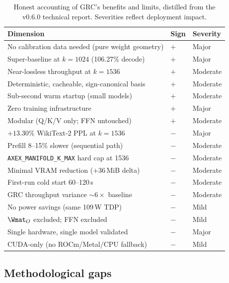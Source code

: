 \documentclass[11pt]{article}
\begin{document}
\begin{table}[h]\centering\footnotesize
\caption{Honest accounting of GRC's benefits and limits, distilled from the
v0.6.0 technical report. Severities reflect deployment impact.}
\begin{tabular}{@{}lll@{}}
\toprule
\textbf{Dimension} & \textbf{Sign} & \textbf{Severity}\\
\midrule
No calibration data needed (pure weight geometry)  & $+$ & Major\\
Super-baseline at $k{=}1024$ (106.27\% decode)     & $+$ & Major\\
Near-lossless throughput at $k{=}1536$             & $+$ & Moderate\\
Deterministic, cacheable, sign-canonical basis     & $+$ & Moderate\\
Sub-second warm startup (small models)             & $+$ & Moderate\\
Zero training infrastructure                       & $+$ & Major\\
Modular (Q/K/V only; FFN untouched)                & $+$ & Moderate\\
\midrule
$+13.30\%$ WikiText-2 PPL at $k{=}1536$            & $-$ & Major\\
Prefill 8--15\% slower (sequential path)           & $-$ & Moderate\\
\texttt{AXEX\_MANIFOLD\_K\_MAX} hard cap at 1536   & $-$ & Moderate\\
Minimal VRAM reduction ($+36$\,MiB delta)          & $-$ & Moderate\\
First-run cold start 60--120\,s                    & $-$ & Moderate\\
GRC throughput variance ${\sim}6\times$ baseline   & $-$ & Moderate\\
No power savings (same 109\,W TDP)                 & $-$ & Mild\\
$\Wmat_O$ excluded; FFN excluded                   & $-$ & Mild\\
Single hardware, single model validated            & $-$ & Major\\
CUDA-only (no ROCm/Metal/CPU fallback)             & $-$ & Mild\\
\bottomrule
\end{tabular}
\end{table}

\subsection{Methodological gaps}
\end{document}
